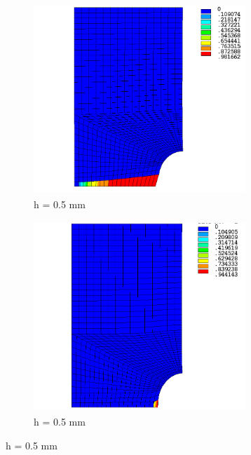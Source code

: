 \documentclass[12pt]{report}
\begin{document}
\begin{figure}[htbp!]\ContinuedFloat 
     \begin{subfigure}{0.4\textwidth}
         \includegraphics[width=8cm,height=7.2cm,keepaspectratio]{25.d1-0.5-r.png}
         \caption{h = 0.5 mm}
         \label{fig:d1-0.5-r}
     \end{subfigure}   
     \hspace{1.8cm}
     \begin{subfigure}{0.4\textwidth}
         \includegraphics[width=8cm,height=7.2cm,keepaspectratio]{25.d1-0.5-nr.png}
         \caption{h = 0.5 mm}
         \label{fig:d1-0.5-nr}
     \end{subfigure}
\end{figure}
\FloatBarrier
\end{document}
